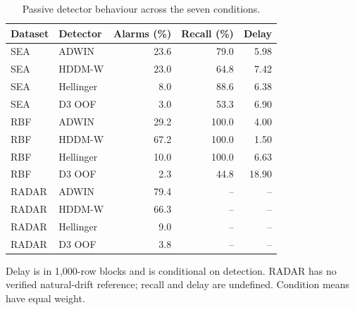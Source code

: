 \begin{table}[htbp]
\centering\small\singlespacing
\caption{Passive detector behaviour across the seven conditions.}\label{tab:passive}
\setlength{\tabcolsep}{4pt}
\renewcommand{\arraystretch}{1.18}
\begin{tabular}{@{}llrrr@{}}
\toprule
Dataset & Detector & Alarms (\%) & Recall (\%) & Delay \\
\midrule
SEA & ADWIN & 23.6 & 79.0 & 5.98 \\
SEA & HDDM-W & 23.0 & 64.8 & 7.42 \\
SEA & Hellinger & 8.0 & 88.6 & 6.38 \\
SEA & D3 OOF & 3.0 & 53.3 & 6.90 \\
RBF & ADWIN & 29.2 & 100.0 & 4.00 \\
RBF & HDDM-W & 67.2 & 100.0 & 1.50 \\
RBF & Hellinger & 10.0 & 100.0 & 6.63 \\
RBF & D3 OOF & 2.3 & 44.8 & 18.90 \\
RADAR & ADWIN & 79.4 & -- & -- \\
RADAR & HDDM-W & 66.3 & -- & -- \\
RADAR & Hellinger & 9.0 & -- & -- \\
RADAR & D3 OOF & 3.8 & -- & -- \\
\bottomrule
\end{tabular}
\par\smallskip\begin{minipage}{\textwidth}\footnotesize Delay is in 1,000-row blocks and is conditional on detection. RADAR has no verified natural-drift reference; recall and delay are undefined. Condition means have equal weight.\end{minipage}
\end{table}
